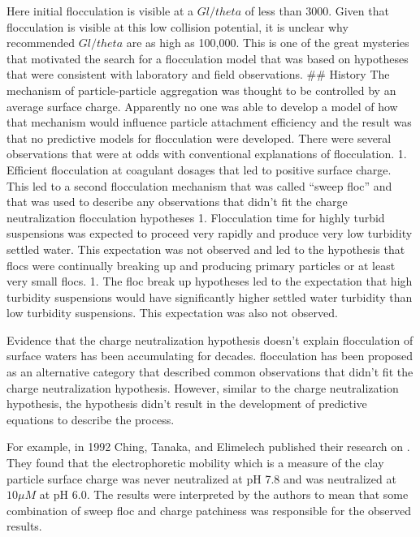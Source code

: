 \documentclass[letterpaper,10pt,english]{sphinxmanual}
\begin{document}
Here initial flocculation is visible at a \(Gl/theta\) of less than
3000. Given that flocculation is visible at this low collision
potential, it is unclear why recommended \(Gl/theta\) are as high as
100,000. This is one of the great mysteries that motivated the search
for a flocculation model that was based on hypotheses that were
consistent with laboratory and field observations. \#\# History The
mechanism of particle-particle aggregation was thought to be controlled
by an average surface charge. Apparently no one was able to develop a
model of how that mechanism would influence particle attachment
efficiency and the result was that no predictive models for flocculation
were developed. There were several observations that were at odds with
conventional explanations of flocculation. 1. Efficient flocculation at
coagulant dosages that led to positive surface charge. This led to a
second flocculation mechanism that was called “sweep floc” and that was
used to describe any observations that didn’t fit the charge
neutralization flocculation hypotheses 1. Flocculation time for highly
turbid suspensions was expected to proceed very rapidly and produce very
low turbidity settled water. This expectation was not observed and led
to the hypothesis that flocs were continually breaking up and producing
primary particles or at least very small flocs. 1. The floc break up
hypotheses led to the expectation that high turbidity suspensions would
have significantly higher settled water turbidity than low turbidity
suspensions. This expectation was also not observed.

Evidence that the charge neutralization hypothesis doesn’t explain
flocculation of surface waters has been accumulating for decades.
 flocculation has been proposed as an alternative category that
described common observations that didn’t fit the charge neutralization
hypothesis. However, similar to the charge neutralization hypothesis,
the  hypothesis didn’t result in the development of predictive
equations to describe the process.

For example, in 1992 Ching, Tanaka, and Elimelech published their
research on . They found
that the electrophoretic mobility which is a measure of the clay
particle surface charge was never neutralized at pH 7.8 and was
neutralized at \(10\mu M\) at pH 6.0. The results were interpreted
by the authors to mean that some combination of sweep floc and charge
patchiness was responsible for the observed results.
\end{document}
